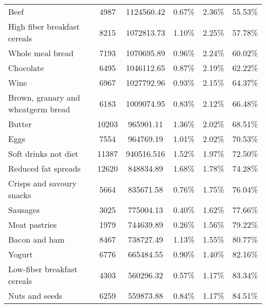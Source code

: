 \documentclass{bmcart}
\begin{document}
\begin{backmatter}
\begin{table}[h!]
\begin{tabular}{lccccc}
		Beef                                                & 4987  & 1124560.42 & 0.67\%        & 2.36\%   & 55.53\%      \\
		High fiber breakfast cereals                        & 8215  & 1072813.73 & 1.10\%        & 2.25\%   & 57.78\%      \\
		Whole meal bread                                    & 7193  & 1070695.89 & 0.96\%        & 2.24\%   & 60.02\%      \\
		Chocolate                                           & 6495  & 1046112.65 & 0.87\%        & 2.19\%   & 62.22\%      \\
		Wine                                                & 6967  & 1027792.96 & 0.93\%        & 2.15\%   & 64.37\%      \\
		Brown, granary and wheatgerm bread                  & 6183  & 1009074.95 & 0.83\%        & 2.12\%   & 66.48\%      \\
		Butter                                              & 10203 & 965901.11  & 1.36\%        & 2.02\%   & 68.51\%      \\
		Eggs                                                & 7554  & 964769.19  & 1.01\%        & 2.02\%   & 70.53\%      \\
		Soft drinks not diet                                & 11387 & 940516.516 & 1.52\%        & 1.97\%   & 72.50\%      \\
		Reduced fat spreads                                 & 12620 & 848834.89  & 1.68\%        & 1.78\%   & 74.28\%      \\
		Crisps and savoury snacks                           & 5664  & 835671.58  & 0.76\%        & 1.75\%   & 76.04\%      \\
		Sausages                                            & 3025  & 775004.13  & 0.40\%        & 1.62\%   & 77.66\%      \\
		Meat pastries                                       & 1979  & 744639.89  & 0.26\%        & 1.56\%   & 79.22\%      \\
		Bacon and ham                                       & 8467  & 738727.49  & 1.13\%        & 1.55\%   & 80.77\%      \\
		Yogurt                                              & 6776  & 665484.55  & 0.90\%        & 1.40\%   & 82.16\%      \\
		Low-fiber breakfast cereals                         & 4303  & 560296.32  & 0.57\%        & 1.17\%   & 83.34\%      \\
		Nuts and seeds                                      & 6259  & 559873.88  & 0.84\%        & 1.17\%   & 84.51\%      \\

\end{tabular}
\end{table}
\end{backmatter}
\end{document}
